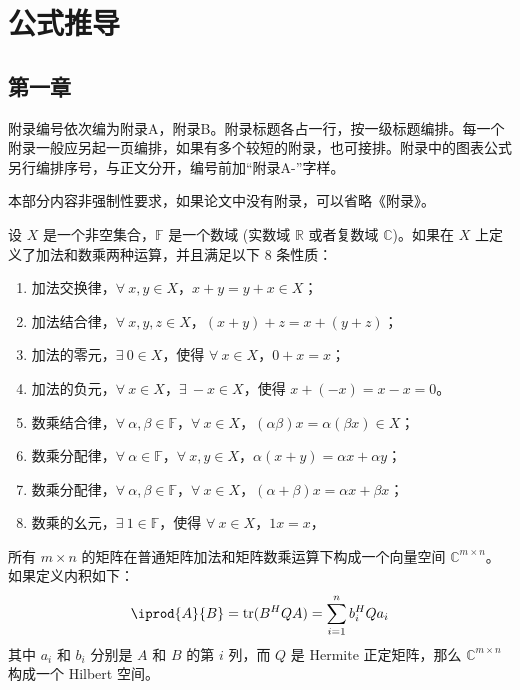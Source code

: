 \chapter{公式推导}

\section{第一章}

附录编号依次编为附录A，附录B。附录标题各占一行，按一级标题编排。每一个附录一般应另起一页编排，如果有多个较短的附录，也可接排。附录中的图表公式另行编排序号，与正文分开，编号前加“附录A-”字样。

{\color{red} 本部分内容非强制性要求，如果论文中没有附录，可以省略《附录》。}


\begin{definition}[向量空间]
  设 $X$ 是一个非空集合，$\mathbb{F}$ 是一个数域 (实数域 $\mathbb{R}$ 或者复数域 $\mathbb{C}$)。如果在 $X$ 上定义了加法和数乘两种运算，并且满足以下 8 条性质：
  \begin{enumerate}
    \item 加法交换律，$\forall~x,y \in X$，$x+y = y+x \in X$；
    \item 加法结合律，$\forall~x,y,z \in X$，$(x+y)+z = x+(y+z)$；
    \item 加法的零元，$\exists~0 \in X$，使得 $\forall~x \in X$，$0+x = x$；
    \item 加法的负元，$\forall~x \in X$，$\exists~-x \in X$，使得 $x+(-x) = x-x = 0$。
    \item 数乘结合律，$\forall~\alpha,\beta \in \mathbb{F}$，$\forall~x \in X$，$(\alpha\beta)x = \alpha(\beta x) \in X$；
    \item 数乘分配律，$\forall~\alpha \in \mathbb{F}$，$\forall~x,y \in X$，$\alpha(x+y) = \alpha x + \alpha y$；
    \item 数乘分配律，$\forall~\alpha,\beta \in \mathbb{F}$，$\forall~x \in X$，$(\alpha+\beta)x = \alpha x + \beta x$；
    \item 数乘的幺元，$\exists~1 \in \mathbb{F}$，使得 $\forall~x \in X$，$1 x = x$，
  \end{enumerate}
\end{definition}

\begin{example}[矩阵空间]
  所有 $m\times n$ 的矩阵在普通矩阵加法和矩阵数乘运算下构成一个向量空间 $\mathbb{C}^{m\times n}$。如果定义内积如下：
  \begin{equation}
  \iprod{A}{B} = \mathrm{tr}(B^H Q A) = \sum_{i=1}^{n} b_i^H Q a_i
  \end{equation}
  其中 $a_i$ 和 $b_i$ 分别是 $A$ 和 $B$ 的第 $i$ 列，而 $Q$ 是 Hermite 正定矩阵，那么 $\mathbb{C}^{m\times n}$ 构成一个 Hilbert 空间。
\end{example}

